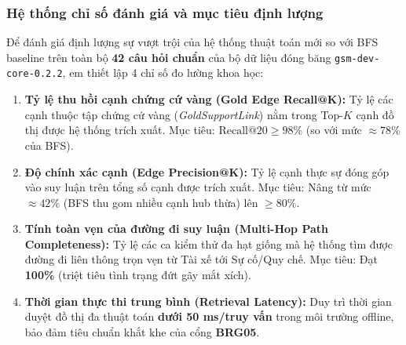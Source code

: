 \documentclass[a4paper,11pt]{article}
\begin{document}
\subsubsection{Hệ thống chỉ số đánh giá và mục tiêu định lượng}
Để đánh giá định lượng sự vượt trội của hệ thống thuật toán mới so với BFS baseline trên toàn bộ \textbf{42 câu hỏi chuẩn} của bộ dữ liệu đóng băng \texttt{gsm-dev-core-0.2.2}, em thiết lập 4 chỉ số đo lường khoa học:
\begin{enumerate}[leftmargin=1.5em,noitemsep]
    \item \textbf{Tỷ lệ thu hồi cạnh chứng cứ vàng (Gold Edge Recall@K):}
    Tỷ lệ các cạnh thuộc tập chứng cứ vàng (\textit{GoldSupportLink}) nằm trong Top-$K$ cạnh đồ thị được hệ thống trích xuất. Mục tiêu: $\text{Recall@20} \ge 98\%$ (so với mức $\approx 78\%$ của BFS).
    \item \textbf{Độ chính xác cạnh (Edge Precision@K):}
    Tỷ lệ cạnh thực sự đóng góp vào suy luận trên tổng số cạnh được trích xuất. Mục tiêu: Nâng từ mức $\approx 42\%$ (BFS thu gom nhiều cạnh hub thừa) lên $\ge 80\%$.
    \item \textbf{Tính toàn vẹn của đường đi suy luận (Multi-Hop Path Completeness):}
    Tỷ lệ các ca kiểm thử đa hạt giống mà hệ thống tìm được đường đi liên thông trọn vẹn từ Tài xế tới Sự cố/Quy chế. Mục tiêu: Đạt \textbf{100\%} (triệt tiêu tình trạng đứt gãy mắt xích).
    \item \textbf{Thời gian thực thi trung bình (Retrieval Latency):}
    Duy trì thời gian duyệt đồ thị đa thuật toán \textbf{dưới 50 ms/truy vấn} trong môi trường offline, bảo đảm tiêu chuẩn khắt khe của cổng \textbf{BRG05}.
\end{enumerate}
\end{document}
